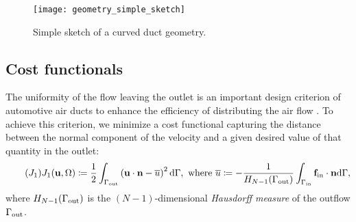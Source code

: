 \documentclass[11pt]{article}
\numberwithin{equation}{section}
\begin{document}
\begin{figure}[H]
    \centering
    \texttt{[image: geometry\_simple\_sketch]}
    \caption{Simple sketch of a curved duct geometry.}
    \label{fig:geometry simple sketch}
\end{figure}

\subsection{Cost functionals}
The uniformity of the flow leaving the outlet is an important design criterion of automotive air ducts to enhance the efficiency of distributing the air flow \cite{Othmer2008}. To achieve this criterion, we minimize a cost functional capturing the distance between the normal component of the velocity and a given desired value of that quantity in the outlet:
\begin{align}
    \label{cost functional: outflow uniformity}
    \tag{$J_1$}
    J_1({\bf u},\Omega)\coloneqq\frac{1}{2}\int_{\Gamma_{\rm out}} \left({\bf u}\cdot{\bf n} - \overline{u}\right)^2{\rm d}\Gamma, \mbox{ where }\overline{u}\coloneqq -\frac{1}{H_{N-1}(\Gamma_{\rm out})}\int_{\Gamma_{\rm in}} \textbf{f}_{\rm in}\cdot{\bf n}{\rm d}\Gamma,
\end{align}
where $H_{N-1}(\Gamma_{\rm out})$ is the $(N - 1)$-dimensional \textit{Hausdorff measure} of the outflow $\Gamma_{\rm out}$.
\end{document}
